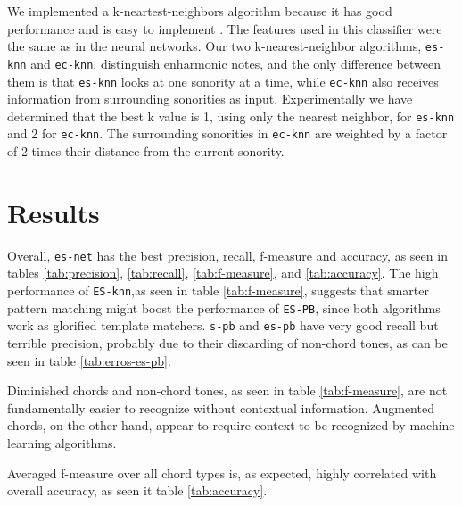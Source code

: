 \documentclass{article}
\begin{document}
We implemented a k-neartest-neighbors algorithm because it has good
performance and is easy to implement \cite{fix.ea:important,
  gomez.ea:estimating}. The features used in this classifier were the
same as in the neural networks. Our two k-nearest-neighbor algorithms,
\texttt{es-knn} and \texttt{ec-knn}, distinguish enharmonic notes, and
the only difference between them is that \texttt{es-knn} looks at one
sonority at a time, while \texttt{ec-knn} also receives information
from surrounding sonorities as input. Experimentally we have
determined that the best k value is 1, using only the nearest
neighbor, for \texttt{es-knn} and 2 for \texttt{ec-knn}. The
surrounding sonorities in \texttt{ec-knn} are weighted by a factor of
2 times their distance from the current sonority.

\section{Results}
\label{sec:discussion}


Overall, \texttt{es-net} has the best precision, recall, f-measure and
accuracy, as seen in tables \ref{tab:precision}, \ref{tab:recall},
\ref{tab:f-measure}, and \ref{tab:accuracy}. The high performance of
\texttt{ES-knn},as seen in table \ref{tab:f-measure}, suggests that
smarter pattern matching might boost the performance of \texttt{ES-PB}, since
both algorithms work as glorified template matchers. \texttt{s-pb} and
\texttt{es-pb} have very good recall but terrible precision, probably
due to their discarding of non-chord tones, as can be seen in table
\ref{tab:erros-es-pb}.


Diminished chords and
non-chord tones, as seen in table \ref{tab:f-measure}, are not
fundamentally easier to recognize without contextual
information. Augmented chords, on the other hand, appear to require
context to be recognized by machine learning algorithms.


Averaged f-measure over all chord types is, as expected, highly
correlated with overall accuracy, as seen it table \ref{tab:accuracy}.
\end{document}
